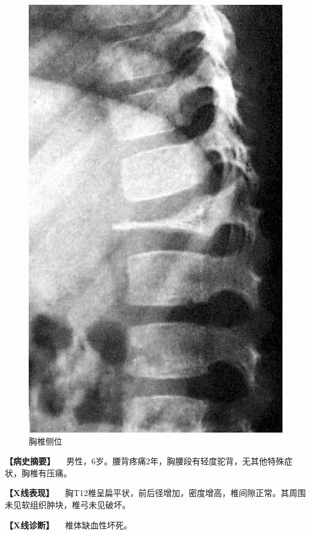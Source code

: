 \begin{figure}[!htbp]
 \centering
 \includegraphics{./images/Image00064.jpg}
 \captionsetup{justification=centering}
 \caption{胸椎侧位}
 \label{fig2-4-3}
  \end{figure} 

\textbf{【病史摘要】}
　男性，6岁。腰背疼痛2年，胸腰段有轻度驼背，无其他特殊症状，胸椎有压痛。

\textbf{【X线表现】}
　胸T12椎呈扁平状，前后径增加，密度增高，椎间隙正常。其周围未见软组织肿块，椎弓未见破坏。

\textbf{【X线诊断】} 　椎体缺血性坏死。

